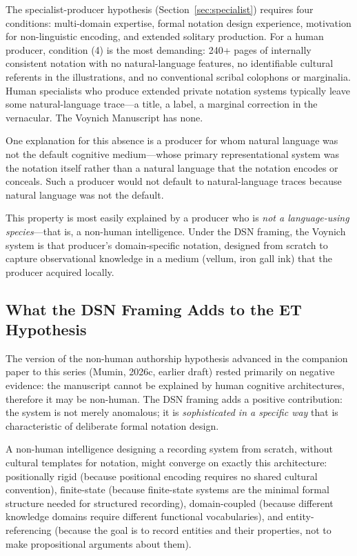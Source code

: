 \documentclass[11pt,a4paper,twocolumn]{article}
\begin{document}
The specialist-producer hypothesis (Section~\ref{sec:specialist}) requires four conditions: multi-domain expertise, formal notation design experience, motivation for non-linguistic encoding, and extended solitary production. For a human producer, condition (4) is the most demanding: 240+ pages of internally consistent notation with no natural-language features, no identifiable cultural referents in the illustrations, and no conventional scribal colophons or marginalia. Human specialists who produce extended private notation systems typically leave some natural-language trace---a title, a label, a marginal correction in the vernacular. The Voynich Manuscript has none.

One explanation for this absence is a producer for whom natural language was not the default cognitive medium---whose primary representational system was the notation itself rather than a natural language that the notation encodes or conceals. Such a producer would not default to natural-language traces because natural language was not the default.

This property is most easily explained by a producer who is \textit{not a language-using species}---that is, a non-human intelligence. Under the DSN framing, the Voynich system is that producer's domain-specific notation, designed from scratch to capture observational knowledge in a medium (vellum, iron gall ink) that the producer acquired locally.

\subsection{What the DSN Framing Adds to the ET Hypothesis}

The version of the non-human authorship hypothesis advanced in the companion paper to this series (Mumin, 2026c, earlier draft) rested primarily on negative evidence: the manuscript cannot be explained by human cognitive architectures, therefore it may be non-human. The DSN framing adds a positive contribution: the system is not merely anomalous; it is \textit{sophisticated in a specific way} that is characteristic of deliberate formal notation design.

A non-human intelligence designing a recording system from scratch, without cultural templates for notation, might converge on exactly this architecture: positionally rigid (because positional encoding requires no shared cultural convention), finite-state (because finite-state systems are the minimal formal structure needed for structured recording), domain-coupled (because different knowledge domains require different functional vocabularies), and entity-referencing (because the goal is to record entities and their properties, not to make propositional arguments about them).
\end{document}

